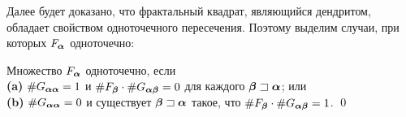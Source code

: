 Далее будет доказано, что фрактальный квадрат, являющийся дендритом, обладает свойством одноточечного пересечения.
Поэтому выделим случаи, при которых $F_{\bm{\alpha}}$ одноточечно:

\begin{corollary}\label{onepoint} 
Множество $F_{\bm{\alpha}}$ одноточечно, если \\
\textbf{(a)} $\#G_{{\bm{\alpha}}{\bm{\alpha}}}=1$ и $\#F_{\bm{\beta}}\cdot\#G_{{\bm{\alpha}}{\bm{\beta}}}=0$ для каждого ${\bm{\beta}}\sqsupset{\bm{\alpha}}$; или\\
\textbf{(b)} $\#G_{{\bm{\alpha}}{\bm{\alpha}}}=0$ и существует ${\bm{\beta}}\sqsupset{\bm{\alpha}}$ такое, что $\#F_{\bm{\beta}}\cdot\#G_{{\bm{\alpha}}{\bm{\beta}}}=1$.
\hfill\qed
\end{corollary}

%
%
%

